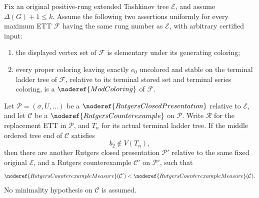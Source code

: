 \begin{lemma}
Fix an original positive-rung extended Tashkinov tree \(\mathcal E\),
and assume \(\Delta(G)+1\leq k\).  Assume the following two assertions
uniformly for every maximum ETT \(\mathcal F\) having the same rung
number as \(\mathcal E\), with arbitrary certified input:
\begin{enumerate}
\item the displayed vertex set of \(\mathcal F\) is elementary under
  its generating coloring;
\item every proper coloring leaving exactly \(e_0\) uncolored and stable
  on the terminal ladder tree of \(\mathcal F\), relative to its
  terminal stored set and terminal series coloring, is a
  \(\noderef{ModColoring}\) of \(\mathcal F\).
\end{enumerate}
Let \(\mathcal P=(\sigma,U,\ldots)\) be a
\(\noderef{RutgersClosedPresentation}\) relative to \(\mathcal E\),
and let \(\mathcal C\) be a \(\noderef{RutgersCounterexample}\) on
\(\mathcal P\).  Write \(\mathcal R\) for the replacement ETT in
\(\mathcal P\), and \(T_n\) for its actual terminal ladder tree.  If
the middle ordered tree end of \(\mathcal C\) satisfies
\[
                              b_2\notin V(T_n),
\]
then there are another Rutgers closed presentation \(\mathcal P'\)
relative to the same fixed original \(\mathcal E\), and a Rutgers
counterexample \(\mathcal C'\) on \(\mathcal P'\), such that
\[
 \noderef{RutgersCounterexampleMeasure}(\mathcal C')
 <
 \noderef{RutgersCounterexampleMeasure}(\mathcal C).
\]
No minimality hypothesis on \(\mathcal C\) is assumed.
\end{lemma}
